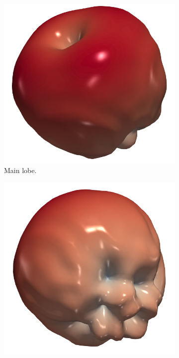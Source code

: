 \documentclass[titlepage]{article}
\renewcommand\_{\textunderscore\linebreak[1]}
\begin{document}
\begin{figure}[H]
  \centering
  \begin{subfigure}[t]{0.3\textwidth}
     \includegraphics[width=1\linewidth]{../regression/OpenParEM3D/antenna/patch_study/screenshots/patch_3D_gain}
     \caption{Main lobe.}
  \end{subfigure}
  \begin{subfigure}[t]{0.3\textwidth}
     \includegraphics[width=1\linewidth]{../regression/OpenParEM3D/antenna/patch_study/screenshots/patch_3D_gain_back_lobes}

\end{subfigure}
\end{figure}
\end{document}
